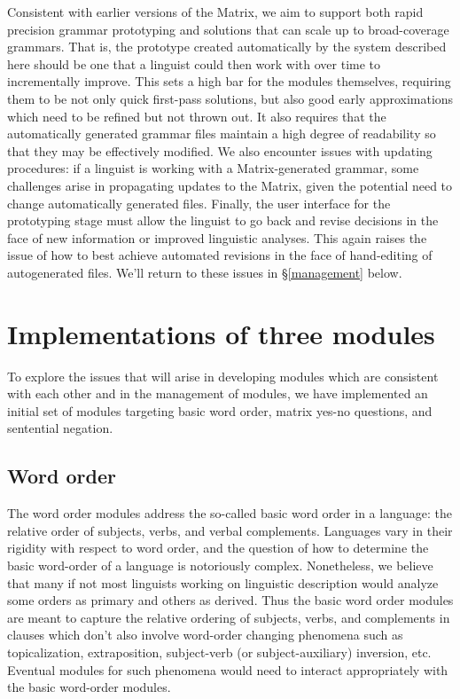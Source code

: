\documentclass[11pt]{article}
\begin{document}
Consistent with earlier versions of the Matrix, we aim to support
both rapid precision grammar prototyping and solutions that can scale up
to broad-coverage grammars.
That is, the prototype created automatically by the system
described here should be one that a linguist could then work with over time
to incrementally improve.  This sets a high bar for the modules themselves,
requiring them to be not only quick first-pass solutions, but also
good early approximations which need to be refined but not thrown out.
It also requires that the automatically generated grammar files 
maintain a high degree of readability so that they may be effectively
modified.  We also encounter issues with updating procedures: if
a linguist is working with a Matrix-generated grammar, some challenges
arise in propagating updates to the Matrix, given the potential need to
change automatically 
generated files.  Finally, the user interface for the prototyping 
stage must allow
the linguist to go back and revise decisions in the face of new
information or improved linguistic analyses.  This again raises the 
issue of how to best achieve automated revisions in the face of hand-editing
of autogenerated files.  We'll return to these issues in \S\ref{management}
below.


\section{Implementations of three modules}

To explore the issues that will arise in developing modules which
are consistent with each other and in the management of modules, we have
implemented an initial set of modules targeting basic
word order, matrix yes-no questions, and sentential negation.  

\subsection{Word order}

The word order modules address the so-called basic word order in
a language: the relative order of subjects, verbs, and verbal complements.
Languages vary in their rigidity with respect to word order, and the
question of how to determine the basic word-order of a language is 
notoriously complex.  Nonetheless, we believe that many if not most
linguists working on linguistic description would analyze some orders
as primary and others as derived.  Thus the basic word order modules
are meant to capture the relative ordering of subjects, verbs, and complements
in clauses which don't also involve word-order changing phenomena
such as topicalization, extraposition, subject-verb (or subject-auxiliary)
inversion, etc.  Eventual modules for such phenomena would need to
interact appropriately with the basic word-order modules.
\end{document}
